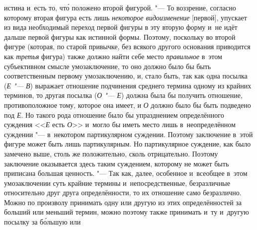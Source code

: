 истина и~есть то, чт\'{о} положено второй фигурой. "--- То
воззрение, согласно которому вторая фигура есть лишь
{\em некоторое видоизменение}
[первой], упускает из вида необходимый переход первой фигуры
в эту вторую форму и~не идёт дальше первой фигуры как
истинной формы. Поэтому, поскольку во второй фигуре (которая, по старой
привычке, без всякого другого основания приводится как
{\em третья} фигура) также должно найти себе место {\em правильное} в~этом
субъективном смысле умозаключение, то оно должно было бы быть
соответственным первому умозаключению, и, стало быть, так как одна посылка
({\em Е "--- В}) выражает отношение подчинения среднего термина одному из
крайних терминов, то другая посылка ({\em О "--- Е})
должна была бы получить отношение, противоположное тому,
которое она имеет, и {\em О} должно было бы быть подведено под
{\em Е}. Но такого рода отношение было бы упразднением определённого суждения
<<{\em Е} есть {\em О}>> и~могло бы иметь
место лишь в~неопределённом суждении "--- в~некотором
партикулярном суждении. Поэтому заключение в~этой фигуре может быть лишь
партикулярным. Но партикулярное суждение, как было замечено выше, столь же
положительно, сколь отрицательно. Поэтому заключение оказывается здесь
таким суждением, которому не может быть приписана большая ценность. "---
Так как, далее, особенное и~всеобщее в~этом умозаключении
суть крайние термины и~непосредственные, безразличные относительно друг
друга определённости, то их отношение само безразлично. Можно по произволу
принимать одну или другую из этих определённостей за больший или меньший
термин, можно поэтому также принимать и~ту и~другую посылку за б\'{о}льшую или
